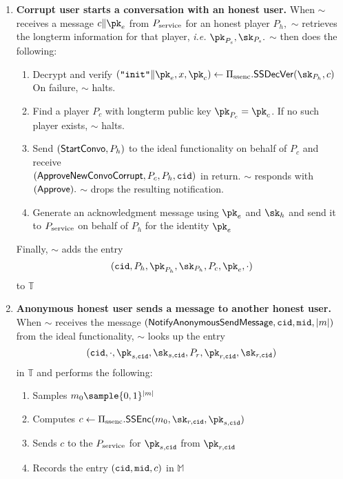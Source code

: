 \begin{enumerate}
	\item \textbf{Corrupt user starts a conversation with an honest user.} When $\sim$ receives a message $c \| \pk_e$ from $P_{\text{service}}$ for an honest player $P_h,$ $\sim$ retrieves the longterm information for that player, {\em i.e.} $\pk_{P_s}, \sk_{P_s}.$  $\sim$ then does the following:
	\begin{enumerate}
		\item Decrypt and verify $(\texttt{``init''} \| \pk_e, x, \pk_c)  \leftarrow \sealedsenderencryptionscheme.\sealedsenderencryptionvdec(\sk_{P_h}, c)$
                On failure, $\sim$ halts.
		\item Find a player $P_c$ with longterm public key $\pk_{P_c}=\pk_c$.  If no such player exists, $\sim$ halts.
		\item Send $(\mathsf{StartConvo}, P_h)$ to the ideal functionality on behalf of $P_c$ and receive \\$(\mathsf{ApproveNewConvoCorrupt}, P_c, P_h, \mathtt{cid})$ in return.  $\sim$ responds with $(\mathsf{Approve}).$  $\sim$ drops the resulting notification.
		\item Generate an acknowledgment message using $\pk_e$ and $\sk_h$ and send it to $P_{\text{service}}$ on behalf of $P_h$ for the identity $\pk_e$
	\end{enumerate}
	Finally, $\sim$ adds the entry $$(\convoid, P_h, \pk_{P_h}, \sk_{P_h}, P_c, \pk_e, \cdot)$$ to $\mathbb{T}$


	\item \textbf{Anonymous honest user sends a message to another honest user.} When $\sim$ receives the message $(\mathsf{NotifyAnonymousSendMessage}, \mathtt{cid}, \mathtt{mid}, | m |)$ from the ideal functionality, $\sim$ looks up the entry $$(\convoid, \cdot, \pk_{s,\convoid}, \sk_{s,\convoid}, P_r, \pk_{r,\convoid}, \sk_{r,\convoid})$$ in $\mathbb{T}$ and performs the following:
	\begin{enumerate}
		\item Samples $m_0 \sample \{0,1\}^{|m|}$
		\item Computes $c \leftarrow \sealedsenderencryptionscheme.\sealedsenderencryptionenc(m_0, \sk_{r,\convoid}, \pk_{s,\convoid})$ 
		\item Sends $c$ to the $P_{\text{service}}$ for $\pk_{s,\convoid}$ from $\pk_{r,\convoid}$
		\item Records the entry $(\mathtt{cid}, \mathtt{mid}, c)$ in $\mathbb{M}$
	\end{enumerate}


\end{enumerate}
